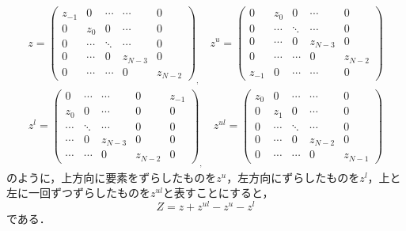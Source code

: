 \begin{eqnarray*}
  z = \left(
    \begin{array}{ccccc}
      z_{-1} & 0      & \cdots & \cdots  & 0       \\
      0      & z_{0}  & 0      & \cdots  & 0       \\
      0      & \cdots & \ddots & \cdots  & 0       \\
      0      & \cdots & 0      & z_{N-3} & 0       \\
      0      & \cdots & \cdots & 0       & z_{N-2}
    \end{array}
  \right)_{,} \quad
  z^{u} = \left(
    \begin{array}{ccccc}
      0      & z_{0}  & 0      & \cdots  & 0       \\
      0      & \cdots & \ddots & \cdots  & 0       \\
      0      & \cdots & 0      & z_{N-3} & 0       \\
      0      & \cdots & \cdots & 0       & z_{N-2} \\
      z_{-1} & 0      & \cdots & \cdots  & 0
    \end{array}
  \right)
\end{eqnarray*}
\begin{eqnarray*}
  z^{l} = \left(
    \begin{array}{ccccc}
      0      & \cdots & \cdots  & 0       & z_{-1} \\
      z_{0}  & 0      & \cdots  & 0       & 0      \\
      \cdots & \ddots & \cdots  & 0       & 0      \\
      \cdots & 0      & z_{N-3} & 0       & 0      \\
      \cdots & \cdots & 0       & z_{N-2} & 0
    \end{array}
  \right)_{,} \quad
  z^{ul} = \left(
    \begin{array}{ccccc}
      z_{0} & 0      & \cdots & \cdots  & 0       \\
      0      & z_{1}  & 0      & \cdots  & 0       \\
      0      & \cdots & \ddots & \cdots  & 0       \\
      0      & \cdots & 0      & z_{N-2} & 0       \\
      0      & \cdots & \cdots & 0       & z_{N-1}
    \end{array}
  \right)
\end{eqnarray*}
のように，上方向に要素をずらしたものを$z^{u}$，左方向にずらしたものを$z^{l}$，上と左に一回ずつずらしたものを$z^{ul}$と表すことにすると，
$$Z = z + z^{ul} - z^{u} - z^{l}$$
である．


